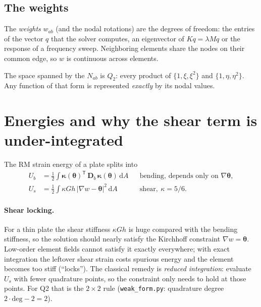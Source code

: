 \documentclass[11pt]{article}
\begin{document}
\subsection{The weights}
The \emph{weights} $w_{ab}$ (and the nodal rotations) are the degrees of freedom:
the entries of the vector $q$ that the solver computes, an eigenvector of
$K q = \lambda M q$ or the response of a frequency sweep. Neighboring elements share
the nodes on their common edge, so $w$ is continuous across elements.

The space spanned by the $N_{ab}$ is $Q_2$: every product of $\{1, \xi, \xi^2\}$ and
$\{1, \eta, \eta^2\}$. Any function of that form is represented \emph{exactly} by its
nodal values.

\section{Energies and why the shear term is under-integrated}

The RM strain energy of a plate splits into
\begin{align}
  U_b &= \tfrac12 \int \boldsymbol{\kappa}(\boldsymbol{\theta})^\mathsf{T}\, \mathbf{D}_b\,
         \boldsymbol{\kappa}(\boldsymbol{\theta}) \,\mathrm{d}A
         && \text{bending, depends only on } \nabla\boldsymbol{\theta}, \\
  U_s &= \tfrac12 \int \kappa G h\, |\nabla w - \boldsymbol{\theta}|^2 \,\mathrm{d}A
         && \text{shear}, \ \kappa = 5/6 .
\end{align}
\paragraph{Shear locking.} For a thin plate the shear stiffness $\kappa G h$ is huge
compared with the bending stiffness, so the solution should nearly satisfy the
Kirchhoff constraint $\nabla w = \boldsymbol{\theta}$. Low-order element fields
cannot satisfy it exactly everywhere; with exact integration the leftover shear
strain costs spurious energy and the element becomes too stiff (``locks''). The
classical remedy is \emph{reduced integration}: evaluate $U_s$ with fewer quadrature
points, so the constraint only needs to hold at those points. For Q2 that is the
$2\times 2$ rule (\texttt{weak\_form.py}: quadrature degree $2\cdot\mathrm{deg} - 2 = 2$).
\end{document}
